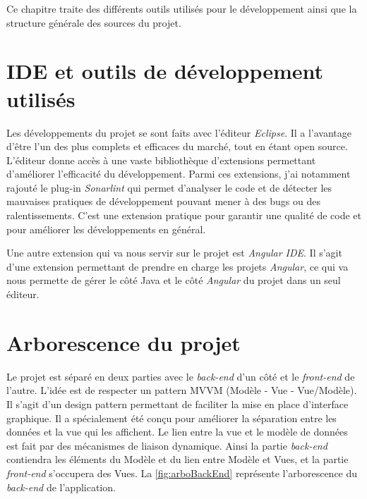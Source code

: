 \documentclass{polytech/polytech}
\begin{document}
Ce chapitre traite des différents outils utilisés pour le développement ainsi que la structure générale des sources du projet. 

\section{IDE et outils de développement utilisés}

Les développements du projet se sont faits avec l'éditeur \textit{Eclipse}. Il a l'avantage d'être l'un des plus complets et efficaces du marché, tout en étant open source. L'éditeur donne accès à une vaste bibliothèque d'extensions permettant d'améliorer l'efficacité du développement. Parmi ces extensions, j'ai notamment rajouté le plug-in \textit{Sonarlint} qui permet d'analyser le code et de détecter les mauvaises pratiques de développement pouvant mener à des bugs ou des ralentissements. C'est une extension pratique pour garantir une qualité de code et pour améliorer les développements en général.

Une autre extension qui va nous servir sur le projet est \textit{Angular IDE}. Il s'agit d'une extension permettant de prendre en charge les projets \textit{Angular}, ce qui va nous permette de gérer le côté Java et le côté \textit{Angular} du projet dans un seul éditeur. 


\section{Arborescence du projet}

Le projet est séparé en deux parties avec le \textit{back-end} d'un côté et le \textit{front-end} de l'autre. L'idée est de respecter un pattern MVVM (Modèle - Vue - Vue/Modèle). Il s'agit d'un design pattern permettant de faciliter la mise en place d'interface graphique. Il a spécialement été conçu pour améliorer la séparation entre les données et la vue qui les affichent. Le lien entre la vue et le modèle de données est fait par des mécanismes de liaison dynamique. Ainsi la partie \textit{back-end} contiendra les éléments du Modèle et du lien entre Modèle et Vues, et la partie \textit{front-end} s'occupera des Vues. La \autoref{fig:arboBackEnd} représente l'arborescence du \textit{back-end} de l'application.
\end{document}
